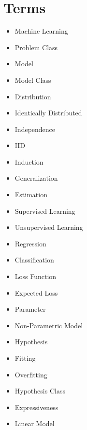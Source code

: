 
    \section{Terms}
    
        \begin{itemize}
            \item Machine Learning
            \item Problem Class
            \item Model
            \item Model Class
            \item Distribution
            \item Identically Distributed
            \item Independence
            \item IID
            \item Induction
            \item Generalization
            \item Estimation
            \item Supervised Learning
            \item Unsupervised Learning
            \item Regression
            \item Classification
            \item Loss Function
            \item Expected Loss
            \item Parameter
            \item Non-Parametric Model
            \item Hypothesis
            \item Fitting
            \item Overfitting
            \item Hypothesis Class
            \item Expressiveness
            \item Linear Model
            
        \end{itemize}
    




        
